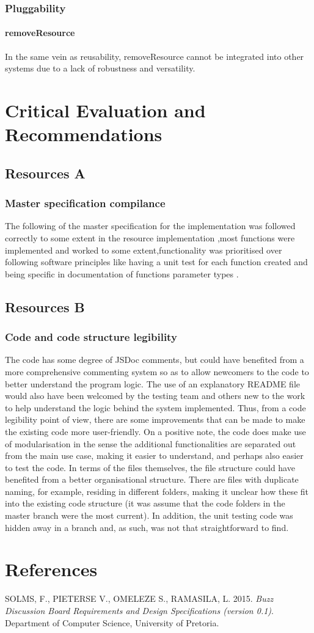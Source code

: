 \documentclass[a4paper]{article}
\begin{document}
\subsubsection {Pluggability}

\paragraph{removeResource}
In the same vein as reusability, removeResource cannot be integrated into other systems due to a lack of robustness and versatility.


\section {Critical Evaluation and Recommendations}
\subsection {Resources A}
\subsubsection {Master specification compilance}
The following of the master specification for the implementation was followed correctly to some extent in the resource implementation ,most functions were implemented and worked to some extent,functionality was prioritised over following software principles like having a unit test for each function created and being specific in documentation of functions parameter types .

\subsection {Resources B}
\subsubsection {Code and code structure legibility}
The code has some degree of JSDoc comments, but could have benefited from a more comprehensive commenting system so as to allow newcomers to the code to better understand the program logic. The use of an explanatory README file would also have been welcomed by the testing team and others new to the work to help understand the logic behind the system implemented. Thus, from a code legibility point of view, there are some improvements that can be made to make the existing code more user-friendly. On a positive note, the code does make use of modularisation in the sense the additional functionalities are separated out from the main use case, making it easier to understand, and perhaps also easier to test the code.
In terms of the files themselves, the file structure could have benefited from a better organisational structure. There are files with duplicate naming, for example, residing in different folders, making it unclear how these fit into the existing code structure (it was assume that the code folders in the master branch were the most current).  In addition, the unit testing code was hidden away in a branch and, as such, was not that straightforward to find.


\section {References}
SOLMS, F., PIETERSE V., OMELEZE S., RAMASILA, L. 2015. \textit{Buzz Discussion Board Requirements and Design Specifications (version 0.1)}. Department of Computer Science, University of Pretoria.
\end{document}
